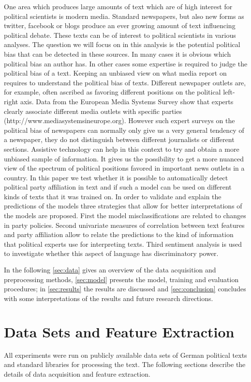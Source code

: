\documentclass[11pt]{article}
\begin{document}
One area which produces large amounts of text which are of high interest for political scientists is modern media. Standard newspapers, but also new forms as twitter, facebook or blogs produce an ever growing amount of text influencing political debate. These texts can be of interest to political scientists in various analyses. The question we will focus on in this analysis is the potential political bias that can be detected in these sources. In many cases it is obvious which political bias an author has. In other cases some expertise is required to judge the political bias of a text. Keeping an unbiased view on what media report on requires to understand the political bias of texts. Different newspaper outlets are, for example, often ascribed as favoring different positions on the political left-right axis. Data from the European Media Systems Survey show that experts clearly associate different media outlets with specific parties (http://www.mediasystemsineurope.org). However such expert surveys on the political bias of newspapers can normally only give us a very general tendency of a newspaper, they do not distinguish between different journalists or different sections. Assistive technology can help in this context to try and obtain a more unbiased sample of information. It gives us the possibility to get a more nuanced view of the spectrum of political positions favored in important news outlets in a country. In this paper we test whether it is possible to automatically detect political party affiliation in text and if such a model can be used on different kinds of texts that it was trained on. 
In order to validate and explain the predictions of the models three strategies that allow for better interpretations of the models are proposed. First the model misclassifications are related to changes in party policies. Second univariate measures of correlation between text features and party affiliation allow to relate the predictions to the kind of information that political experts use for interpreting texts. Third sentiment analysis is used to investigate whether this aspect of language has discriminatory power.

In the following \autoref{sec:data} gives an overview of the data acquisition and preprocessing methods, \autoref{sec:model} presents the model, training and evaluation procedures; in \autoref{sec:results} the results are discussed and \autoref{sec:conclusion} concludes with some interpretations of the results and future research directions.

\section{Data Sets and Feature Extraction}\label{sec:data}
%
All experiments were run on publicly available data sets of German political texts and standard libraries for processing the text. The following sections describe the details of data acquisition and feature extraction.
\end{document}
